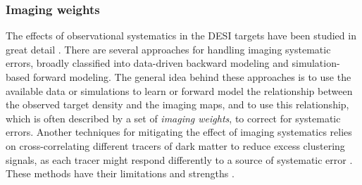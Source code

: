 \subsubsection{Imaging weights}
The effects of observational systematics in the DESI targets have been studied in great detail \cite[see, e.g.,][]{kitanidis2020imaging, zhou2021clustering, chaussidon2022angular}. There are several approaches for handling imaging systematic errors, broadly classified into data-driven backward modeling and simulation-based forward modeling. The general idea behind these approaches is to use the available data or simulations to learn or forward model the relationship between the observed target density and the imaging maps, and to use this relationship, which is often described by a set of \textit{imaging weights}, to correct for systematic errors. Another techniques for mitigating the effect of imaging systematics relies on cross-correlating different tracers of dark matter to reduce excess clustering signals, as each tracer might respond differently to a source of systematic error \citep[see, e.g.,][]{giannantonio2014improved}. These methods have their limitations and strengths \citep[see, e.g.,][for a review]{2021MNRAS.503.5061W}.

